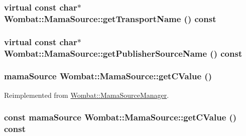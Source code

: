 \label{classWombat_1_1MamaSource_a6c7cba3c44c57cce76be998909eac57a}
\hypertarget{classWombat_1_1MamaSource_af7c56d50e0bdb321b2214b82e0202265}{
\subsubsection[{getTransportName}]{\setlength{\rightskip}{0pt plus 5cm}virtual const char$\ast$ Wombat::MamaSource::getTransportName () const}}
\label{classWombat_1_1MamaSource_af7c56d50e0bdb321b2214b82e0202265}
\hypertarget{classWombat_1_1MamaSource_a3e800a64210eaf96e8fbb7fcee94a464}{
\subsubsection[{getPublisherSourceName}]{\setlength{\rightskip}{0pt plus 5cm}virtual const char$\ast$ Wombat::MamaSource::getPublisherSourceName () const}}
\label{classWombat_1_1MamaSource_a3e800a64210eaf96e8fbb7fcee94a464}
\hypertarget{classWombat_1_1MamaSource_a84f406ac743b6b1bbad5adfc8e14db3c}{
\subsubsection[{getCValue}]{\setlength{\rightskip}{0pt plus 5cm}mamaSource Wombat::MamaSource::getCValue ()}}
\label{classWombat_1_1MamaSource_a84f406ac743b6b1bbad5adfc8e14db3c}


Reimplemented from \hyperlink{classWombat_1_1MamaSourceManager_ac3c7d7a8d70fde45f6a45caa669c88e7}{Wombat::MamaSourceManager}.\hypertarget{classWombat_1_1MamaSource_a53b49953e08d89062dd97e476e1a2e02}{
\subsubsection[{getCValue}]{\setlength{\rightskip}{0pt plus 5cm}const mamaSource Wombat::MamaSource::getCValue () const}}
\label{classWombat_1_1MamaSource_a53b49953e08d89062dd97e476e1a2e02}


